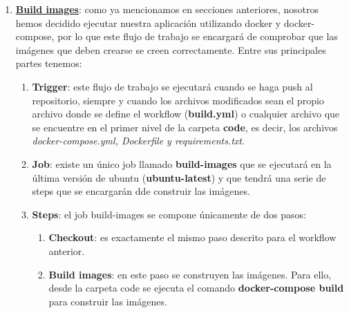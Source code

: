 \begin{enumerate}
        \item \textbf{\href{https://github.com/alexespana/TFG/actions/workflows/build.yml}
        {Build images}}: como ya mencionamos en secciones anteriores, nosotros hemos decidido
        ejecutar nuestra aplicación utilizando docker y docker-compose, por lo que este flujo
        de trabajo se encargará de comprobar que las imágenes que deben crearse se creen
        correctamente. Entre sus principales partes tenemos:
            \begin{enumerate}
                \item \textbf{Trigger}: este flujo de trabajo se ejecutará cuando se haga
                push al repositorio, siempre y cuando los archivos modificados sean el propio
                archivo donde se define el workflow (\textbf{build.yml}) o cualquier archivo
                que se encuentre en el primer nivel de la carpeta \textbf{code}, es decir, los
                archivos \textit{docker-compose.yml, Dockerfile y requirements.txt}.
                \item \textbf{Job}: existe un único job llamado \textbf{build-images} que se
                ejecutará en la última versión de ubuntu (\textbf{ubuntu-latest}) y que
                tendrá una serie de steps que se encargarán dde construir las imágenes.
                \item \textbf{Steps}: el job build-images se compone únicamente de dos pasos:
                    \begin{enumerate}
                        \item \textbf{Checkout}: es exactamente el mismo paso descrito para
                        el workflow anterior.
                        \item \textbf{Build images}: en este paso se construyen las
                        imágenes. Para ello, desde la carpeta code se ejecuta el comando
                        \textbf{docker-compose build} para construir las imágenes.
                    \end{enumerate}
            \end{enumerate}


\end{enumerate}
